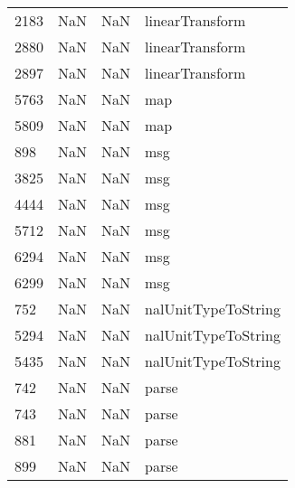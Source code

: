 \begin{tabular}{llll}
2183 &                   NaN &                        NaN &                           linearTransform \\
2880 &                   NaN &                        NaN &                           linearTransform \\
2897 &                   NaN &                        NaN &                           linearTransform \\
5763 &                   NaN &                        NaN &                                       map \\
5809 &                   NaN &                        NaN &                                       map \\
898  &                   NaN &                        NaN &                                       msg \\
3825 &                   NaN &                        NaN &                                       msg \\
4444 &                   NaN &                        NaN &                                       msg \\
5712 &                   NaN &                        NaN &                                       msg \\
6294 &                   NaN &                        NaN &                                       msg \\
6299 &                   NaN &                        NaN &                                       msg \\
752  &                   NaN &                        NaN &                       nalUnitTypeToString \\
5294 &                   NaN &                        NaN &                       nalUnitTypeToString \\
5435 &                   NaN &                        NaN &                       nalUnitTypeToString \\
742  &                   NaN &                        NaN &                                     parse \\
743  &                   NaN &                        NaN &                                     parse \\
881  &                   NaN &                        NaN &                                     parse \\
899  &                   NaN &                        NaN &                                     parse \\

\end{tabular}
